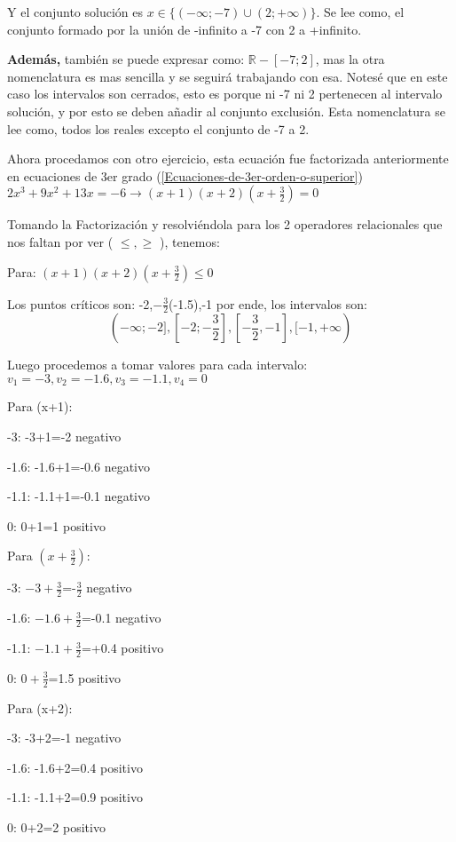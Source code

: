    Y el conjunto solución es $x\in \{(-\infty;-7)\cup(2;+\infty) \} $.
    Se lee como, el conjunto formado por la unión de -infinito  a -7 con 2 a +infinito.


    \textbf{Además,} también se puede expresar como: $ \mathbb{R}-{[-7;2]} $, mas
    la otra nomenclatura es mas sencilla y se seguirá trabajando con esa. Notesé
    que en este caso los intervalos son cerrados, esto es porque ni -7 ni 2 pertenecen
    al intervalo solución, y por esto se deben añadir al conjunto exclusión.
    Esta nomenclatura se lee como, todos los reales excepto el conjunto de -7 a 2.

    Ahora procedamos con otro ejercicio, esta ecuación fue factorizada anteriormente
    en ecuaciones de 3er grado (\ref{Ecuaciones-de-3er-orden-o-superior})
    $ 2x^3+9x^2+13x = -6 \rightarrow (x+1)(x+2)\left(x+\frac{3}{2}\right) =  0  $

    Tomando la Factorización y resolviéndola para los 2 operadores relacionales
    que nos faltan por ver ( $ \leq,\geq $  ), tenemos:

    Para: $ (x+1)(x+2)\left(x+\frac{3}{2}\right) \leq 0 $

    Los puntos críticos son: -2,$ -\frac{3}{2}$(-1.5),-1 por ende, los intervalos
    son:
    $$\displaystyle (-\infty;-2], [-2;-\frac{3}{2}],[-\frac{3}{2},-1],  [-1,+\infty) $$

    Luego procedemos a tomar valores para cada intervalo:
    $ v_1=-3,v_2= -1.6,v_3= -1.1,v_4= 0 $

    Para (x+1):

    -3: -3+1=-2 negativo

    -1.6: -1.6+1=-0.6 negativo

    -1.1: -1.1+1=-0.1 negativo

    0: 0+1=1 positivo

    Para $\left(x+\frac{3}{2}\right)$:

    -3: $-3+\frac{3}{2}$=-$\frac{3}{2} $ negativo

    -1.6: $-1.6+\frac{3}{2}$=-0.1 negativo

    -1.1: $-1.1+\frac{3}{2}$=+0.4 positivo

    0: $0+\frac{3}{2}$=1.5 positivo

    Para (x+2):

    -3: -3+2=-1 negativo

    -1.6: -1.6+2=0.4 positivo

    -1.1: -1.1+2=0.9 positivo

    0: 0+2=2 positivo


